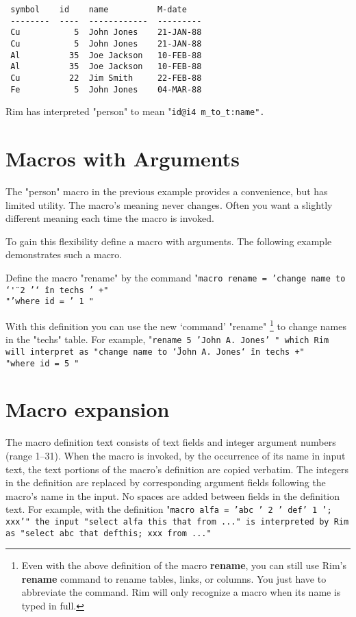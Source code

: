 \begin{verbatim}
 symbol    id    name          M-date
 --------  ----  ------------  ---------
 Cu           5  John Jones    21-JAN-88
 Cu           5  John Jones    21-JAN-88
 Al          35  Joe Jackson   10-FEB-88
 Al          35  Joe Jackson   10-FEB-88
 Cu          22  Jim Smith     22-FEB-88
 Fe           5  John Jones    04-MAR-88
\end{verbatim}
\enddemo
 
Rim has interpreted "person" to mean
"\tt id@i4 m_to_t:name".
 
\section{Macros with Arguments}
The "person" macro in the previous example provides a convenience,
but has limited utility.  The macro's meaning never changes.
Often you want a slightly different meaning
each time the macro is invoked.
 
To gain this flexibility define a macro
with arguments.
The following example demonstrates such a macro.
 
Define the macro "rename" by the command
\<"\tt macro rename = 'change name to \char`\"' 2 '\char`\"\ in techs ' +"\\
   \qquad "\tt 'where id = ' 1 "\>
\label{rename-def}
 
With this definition
you can use the new `command' "rename"%
   \footnote{ Even with the above definition of the macro
   {\bf rename}, you can
    still use Rim's {\bf rename} command to rename tables, links, or
   columns.  You just have to abbreviate the command.
   Rim will only recognize a macro when its name
   is typed in full.}
to change names in
the "techs" table. For example,
\<"\tt rename 5 'John A. Jones' "\>
which Rim will interpret as
\<"\tt change name to \char`\"John A. Jones\char`\"\ in techs +"\\
   \qquad "\tt where id = 5 "\>
 
\section{Macro expansion}
The macro definition text consists of text fields
and integer argument numbers (range 1--31).
When the macro is invoked,
by the occurrence of its name in input text, the text portions
of the macro's definition are copied verbatim.  The integers
in the definition are replaced by corresponding argument
fields following the macro's name in the input.
No spaces are added between fields in the definition text.
For example, with the definition
\<"\tt macro alfa = 'abc ' 2 ' def' 1 '; xxx'"\>
the input
\<"\tt select alfa this that from ..."\>
is interpreted by Rim as
\<"\tt select abc that defthis; xxx from ..."\>
 
